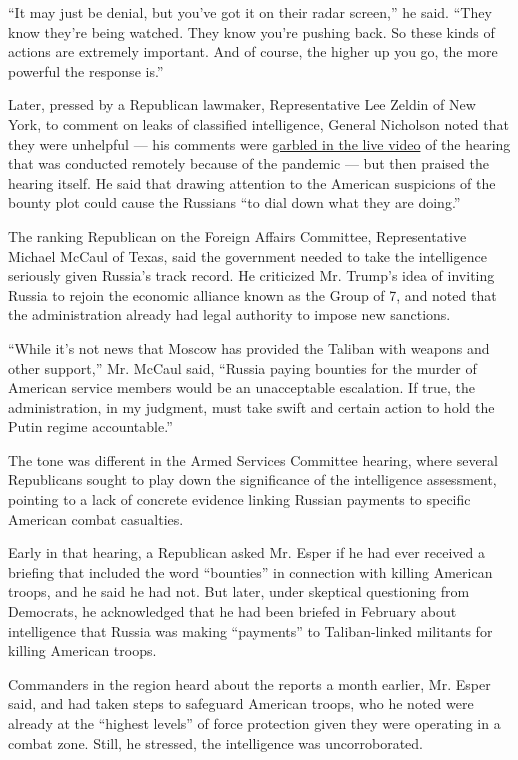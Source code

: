 ``It may just be denial, but you've got it on their radar screen,'' he
said. ``They know they're being watched. They know you're pushing back.
So these kinds of actions are extremely important. And of course, the
higher up you go, the more powerful the response is.''

Later, pressed by a Republican lawmaker, Representative Lee Zeldin of
New York, to comment on leaks of classified intelligence, General
Nicholson noted that they were unhelpful --- his comments were
\href{https://www.youtube.com/watch?v=9m_qt2lPmvU}{garbled in the live
video} of the hearing that was conducted remotely because of the
pandemic --- but then praised the hearing itself. He said that drawing
attention to the American suspicions of the bounty plot could cause the
Russians ``to dial down what they are doing.''

The ranking Republican on the Foreign Affairs Committee, Representative
Michael McCaul of Texas, said the government needed to take the
intelligence seriously given Russia's track record. He criticized Mr.
Trump's idea of inviting Russia to rejoin the economic alliance known as
the Group of 7, and noted that the administration already had legal
authority to impose new sanctions.

``While it's not news that Moscow has provided the Taliban with weapons
and other support,'' Mr. McCaul said, ``Russia paying bounties for the
murder of American service members would be an unacceptable escalation.
If true, the administration, in my judgment, must take swift and certain
action to hold the Putin regime accountable.''

The tone was different in the Armed Services Committee hearing, where
several Republicans sought to play down the significance of the
intelligence assessment, pointing to a lack of concrete evidence linking
Russian payments to specific American combat casualties.

Early in that hearing, a Republican asked Mr. Esper if he had ever
received a briefing that included the word ``bounties'' in connection
with killing American troops, and he said he had not. But later, under
skeptical questioning from Democrats, he acknowledged that he had been
briefed in February about intelligence that Russia was making
``payments'' to Taliban-linked militants for killing American troops.

Commanders in the region heard about the reports a month earlier, Mr.
Esper said, and had taken steps to safeguard American troops, who he
noted were already at the ``highest levels'' of force protection given
they were operating in a combat zone. Still, he stressed, the
intelligence was uncorroborated.

